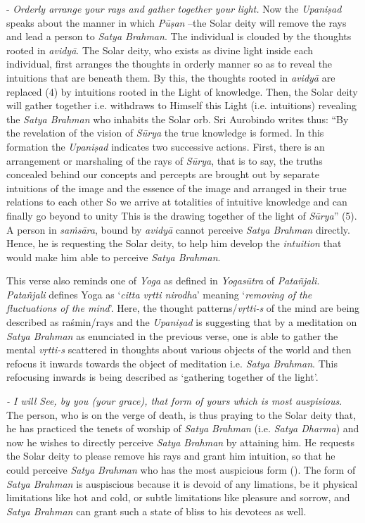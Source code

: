 - \emph{Orderly arrange your rays and gather together your light.} Now the \emph{Upaniṣad} speaks about the manner in which \emph{Pūṣan} --the Solar deity will remove the rays and lead a person to \emph{Satya Brahman}. The individual is clouded by the thoughts rooted in \emph{avidyā}. The Solar deity, who exists as divine light inside each individual, first arranges the thoughts in orderly manner so as to reveal the intuitions that are beneath them. By this, the thoughts rooted in \emph{avidyā} are replaced (4) by intuitions rooted in the Light of knowledge. Then, the Solar deity will gather together i.e. withdraws to Himself this Light (i.e. intuitions) revealing the \emph{Satya Brahman} who inhabits the Solar orb. Sri Aurobindo writes thus: ``By the revelation of the vision of \emph{Sūrya} the true knowledge is formed. In this formation the \emph{Upaniṣad} indicates two successive actions. First, there is an arrangement or marshaling of the rays of \emph{Sūrya}, that is to say, the truths concealed behind our concepts and percepts are brought out by separate intuitions of the image and the essence of the image and arranged in their true relations to each other So we arrive at totalities of intuitive knowledge and can finally go beyond to unity This is the drawing together of the light of \emph{Sūrya}'' (5). A person in \emph{saṁsāra}, bound by \emph{avidyā} cannot perceive \emph{Satya Brahman} directly. Hence, he is requesting the Solar deity, to help him develop the \emph{intuition} that would make him able to perceive \emph{Satya Brahman}.

This verse also reminds one of \emph{Yoga} as defined in \emph{Yogasūtra} of \emph{Patañjali}. \emph{Patañjali} defines Yoga as `\emph{citta vṛtti nirodha}' meaning `\emph{removing of the fluctuations of the mind}'. Here, the thought patterns/\emph{vṛtti-s} of the mind are being described as raśmin/rays and the \emph{Upaniṣad} is suggesting that by a meditation on \emph{Satya Brahman} as enunciated in the previous verse, one is able to gather the mental \emph{vṛtti-s} scattered in thoughts about various objects of the world and then refocus it inwards towards the object of meditation i.e. \emph{Satya Brahman}. This refocusing inwards is being described as `gathering together of the light'.

\emph{- I will See, by you (your grace), that form of yours which is most auspisious}. The person, who is on the verge of death, is thus praying to the Solar deity that, he has practiced the tenets of worship of \emph{Satya Brahman} (i.e. \emph{Satya Dharma}) and now he wishes to directly perceive \emph{Satya Brahman} by attaining him. He requests the Solar deity to please remove his rays and grant him intuition, so that he could perceive \emph{Satya Brahman} who has the most auspicious form (). The form of \emph{Satya Brahman} is auspiscious because it is devoid of any limations, be it physical limitations like hot and cold, or subtle limitations like pleasure and sorrow, and \emph{Satya Brahman} can grant such a state of bliss to his devotees as well.
\newpage

